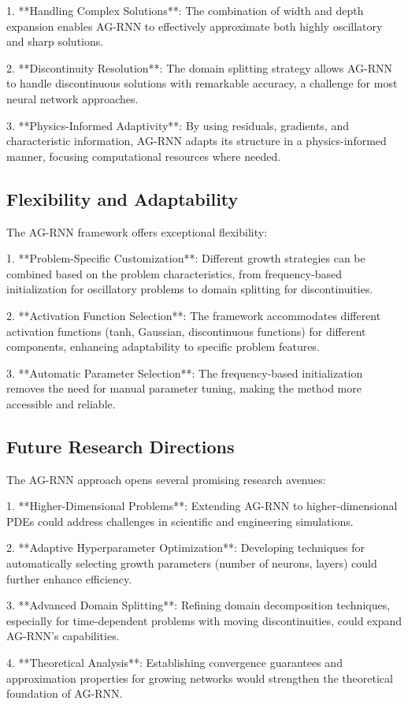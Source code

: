 \documentclass[11pt,a4paper]{article}
\begin{document}
1. **Handling Complex Solutions**: The combination of width and depth expansion enables AG-RNN to effectively approximate both highly oscillatory and sharp solutions.

2. **Discontinuity Resolution**: The domain splitting strategy allows AG-RNN to handle discontinuous solutions with remarkable accuracy, a challenge for most neural network approaches.

3. **Physics-Informed Adaptivity**: By using residuals, gradients, and characteristic information, AG-RNN adapts its structure in a physics-informed manner, focusing computational resources where needed.

\subsection{Flexibility and Adaptability}

The AG-RNN framework offers exceptional flexibility:

1. **Problem-Specific Customization**: Different growth strategies can be combined based on the problem characteristics, from frequency-based initialization for oscillatory problems to domain splitting for discontinuities.

2. **Activation Function Selection**: The framework accommodates different activation functions (tanh, Gaussian, discontinuous functions) for different components, enhancing adaptability to specific problem features.

3. **Automatic Parameter Selection**: The frequency-based initialization removes the need for manual parameter tuning, making the method more accessible and reliable.

\subsection{Future Research Directions}

The AG-RNN approach opens several promising research avenues:

1. **Higher-Dimensional Problems**: Extending AG-RNN to higher-dimensional PDEs could address challenges in scientific and engineering simulations.

2. **Adaptive Hyperparameter Optimization**: Developing techniques for automatically selecting growth parameters (number of neurons, layers) could further enhance efficiency.

3. **Advanced Domain Splitting**: Refining domain decomposition techniques, especially for time-dependent problems with moving discontinuities, could expand AG-RNN's capabilities.

4. **Theoretical Analysis**: Establishing convergence guarantees and approximation properties for growing networks would strengthen the theoretical foundation of AG-RNN.
\end{document}
